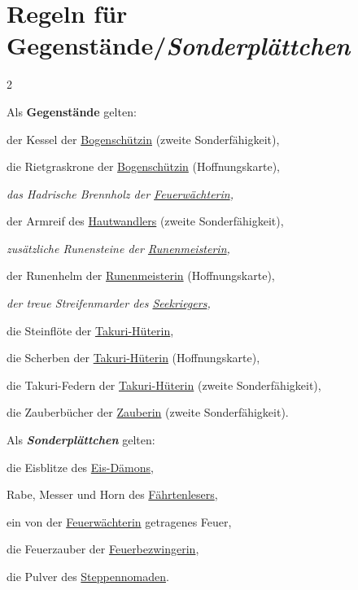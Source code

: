 \documentclass[10pt, a4paper, oneside]{book}
\newcommand{\fan}[1]{\textit{#1}}
\begin{document}
\chapter{Regeln für Gegenstände/\fan{Sonderplättchen}}
\label{Gegenstände und Sonderplättchen}


\begin{multicols*}{2}\raggedcolumns



Als \textbf{Gegenstände} gelten:


\bullet{} der Kessel der \hyperref[Bogenschützin]{Bogenschützin} (zweite Sonderfähigkeit),

\bullet{} die Rietgraskrone der \hyperref[Bogenschützin]{Bogenschützin} (Hoffnungskarte),

\bullet{} \fan{das Hadrische Brennholz der \hyperref[Feuerwächterin]{Feuerwächterin},}

\bullet{} der Armreif des \hyperref[Hautwandler]{Hautwandlers} (zweite Sonderfähigkeit),

\bullet{} \fan{zusätzliche Runensteine der \hyperref[Runenmeisterin]{Runenmeisterin},}

\bullet{} der Runenhelm der \hyperref[Runenmeisterin]{Runenmeisterin} (Hoffnungskarte),

\bullet{} \fan{der treue Streifenmarder des \hyperref[Seekrieger]{Seekriegers},}

\bullet{} die Steinflöte der \hyperref[Takuri-Hüterin]{Takuri-Hüterin},

\bullet{} die Scherben der \hyperref[Takuri-Hüterin]{Takuri-Hüterin} (Hoffnungskarte),

\bullet{} die Takuri-Federn der \hyperref[Takuri-Hüterin]{Takuri-Hüterin} (zweite Sonderfähigkeit),

\bullet{} die Zauberbücher der \hyperref[Zauberin]{Zauberin} (zweite Sonderfähigkeit).
\bigskip




Als \textbf{\fan{Sonderplättchen}} gelten:

\bullet{} die Eisblitze des \hyperref[Eis-Dämon]{Eis-Dämons},

\bullet{} Rabe, Messer und Horn des \hyperref[Fährtenleser]{Fährtenlesers},

\bullet{} ein von der \hyperref[Feuerwächterin]{Feuerwächterin} getragenes Feuer,

\bullet{} die Feuerzauber der \hyperref[Feuerbezwingerin]{Feuerbezwingerin},

\bullet{} die Pulver des \hyperref[Steppennomade]{Steppennomaden}.






\end{multicols*}
\end{document}
